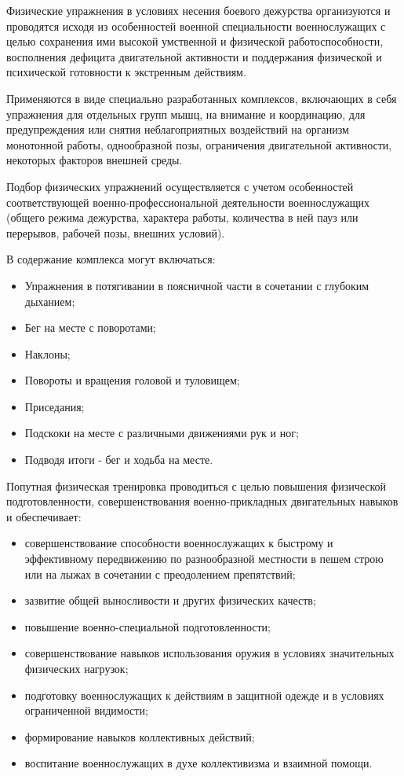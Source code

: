 \documentclass[a4paper]{article}
\begin{document}
    Физические упражнения в условиях несения боевого дежурства организуются и проводятся исходя из особенностей военной специальности военнослужащих с целью сохранения ими высокой умственной и физической работоспособности, восполнения дефицита двигательной активности и поддержания физической и психической готовности к экстренным действиям.

    Применяются в виде специально разработанных комплексов, включающих в себя упражнения для отдельных групп мышц, на внимание и координацию, для предупреждения или снятия неблагоприятных воздействий на организм монотонной работы, однообразной позы, ограничения двигательной активности, некоторых факторов внешней среды.

    Подбор физических упражнений осуществляется с учетом особенностей соответствующей военно-профессиональной деятельности военнослужащих (общего режима дежурства, характера работы, количества в ней пауз или перерывов, рабочей позы, внешних условий).

    В содержание комплекса могут включаться:

    \begin{itemize}
        \item Упражнения в потягивании в поясничной части в сочетании с глубоким дыханием;
        \item Бег на месте с поворотами;
        \item Наклоны;
        \item Повороты и вращения головой и туловищем;
        \item Приседания;
        \item Подскоки на месте с различными движениями рук и ног;
        \item Подводя итоги - бег и ходьба на месте.
    \end{itemize}

    Попутная физическая тренировка проводиться с целью повышения физической подготовленности, совершенствования военно-прикладных двигательных навыков и обеспечивает:

    \begin{itemize}
        \item совершенствование способности военнослужащих к быстрому и эффективному передвижению по разнообразной местности в пешем строю или на лыжах в сочетании с преодолением препятствий;
        \item зазвитие общей выносливости и других физических качеств;
        \item повышение военно-специальной подготовленности;
        \item совершенствование навыков использования оружия в условиях значительных физических нагрузок;
        \item подготовку военнослужащих к действиям в защитной одежде и в условиях ограниченной видимости;
        \item формирование навыков коллективных действий;
        \item воспитание военнослужащих в духе коллективизма и взаимной помощи.
    \end{itemize}
\end{document}
